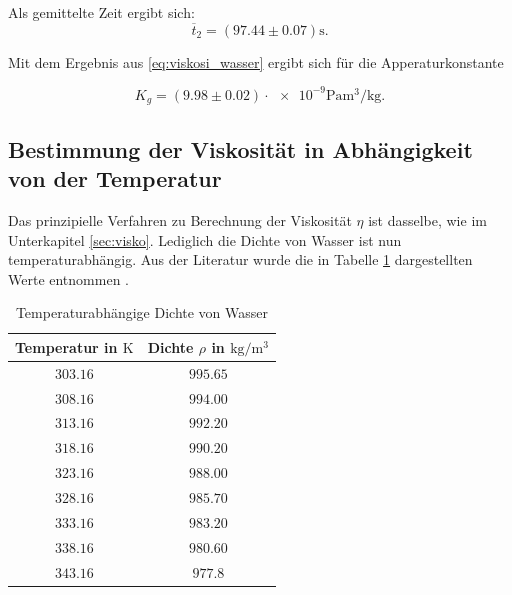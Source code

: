 Als gemittelte Zeit ergibt sich:
\begin{equation}
\label{eq:gemittelte_fallzeit_gross}
\overline{t}_{2}=\left(\num{97.44}\pm\num{0.07}\right) \si{\second}.
\end{equation}

Mit dem Ergebnis aus \eqref{eq:viskosi_wasser} ergibt sich für die
Apperaturkonstante

\begin{equation}
\label{eq:app_konst_gross}
K_{g}=\left(\num{9.98}\pm\num{0.02}\right)\cdot{\num{e-9}} \si{\pascal\cubic\meter\per\kilogram}.
\end{equation}

\subsection{Bestimmung der Viskosität in Abhängigkeit von der Temperatur}

Das prinzipielle Verfahren zu Berechnung der Viskosität $\eta$ ist
dasselbe, wie im Unterkapitel \ref{sec:visko}. %
Lediglich die Dichte von Wasser ist nun temperaturabhängig.
Aus der Literatur wurde die in Tabelle \ref{tab:dichtewasser} dargestellten Werte
entnommen \cite{lit_dichte}.  %

\begin{table}
\centering
\begin{tabular} {cc}
  \toprule
  Temperatur in $\si{\kelvin}$ & Dichte $\rho$ in $\si{\kilogram\per\cubic\meter}$ \\
  \midrule
  $\num{303.16}$ &$\num{995.65}$ \\
  $\num{308.16}$ &$\num{994.00}$\\
  $\num{313.16}$ &$\num{992.20}$\\
  $\num{318.16}$ &$\num{990.20}$\\
  $\num{323.16}$ &$\num{988.00}$\\
  $\num{328.16}$ &$\num{985.70}$\\
  $\num{333.16}$ &$\num{983.20}$\\
  $\num{338.16}$ &$\num{980.60}$\\
  $\num{343.16}$ &$\num{977.8}$\\
\bottomrule
\end{tabular}
\caption{Temperaturabhängige Dichte von Wasser}
\label{tab:dichtewasser}
\end{table}


